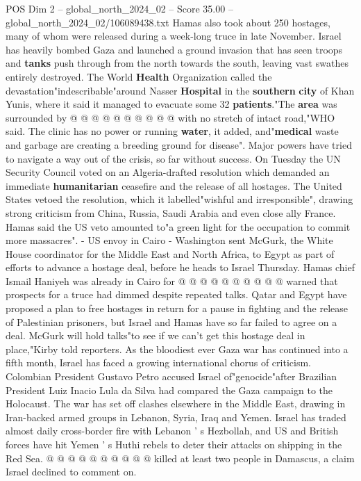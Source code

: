 \begin{textsample}{POS Dim 2 – global\_north\_2024\_02 – Score 35.00 – global\_north\_2024\_02/106089438.txt}
Hamas also took about 250 hostages, many of whom were released during a week-long truce in late November.
Israel has heavily bombed Gaza and launched a ground invasion that has seen troops and \textbf{tanks} push through from the north towards the south, leaving vast swathes entirely destroyed.
The World \textbf{Health} Organization called the devastation"indescribable"around Nasser \textbf{Hospital} in the \textbf{southern} \textbf{city} of Khan Yunis, where it said it managed to evacuate some 32 \textbf{patients}."The \textbf{area} was surrounded by @ @ @ @ @ @ @ @ @ @ with no stretch of intact road,"WHO said.
The clinic has no power or running \textbf{water}, it added, and"\textbf{medical} waste and garbage are creating a breeding ground for disease".
Major powers have tried to navigate a way out of the crisis, so far without success.
On Tuesday the UN Security Council voted on an Algeria-drafted resolution which demanded an immediate \textbf{humanitarian} ceasefire and the release of all hostages.
The United States vetoed the resolution, which it labelled"wishful and irresponsible", drawing strong criticism from China, Russia, Saudi Arabia and even close ally France.
Hamas said the US veto amounted to"a green light for the occupation to commit more massacres". - US envoy in Cairo - Washington sent McGurk, the White House coordinator for the Middle East and North Africa, to Egypt as part of efforts to advance a hostage deal, before he heads to Israel Thursday.
Hamas chief Ismail Haniyeh was already in Cairo for @ @ @ @ @ @ @ @ @ @ warned that prospects for a truce had dimmed despite repeated talks.
Qatar and Egypt have proposed a plan to free hostages in return for a pause in fighting and the release of Palestinian prisoners, but Israel and Hamas have so far failed to agree on a deal.
McGurk will hold talks"to see if we can't get this hostage deal in place,"Kirby told reporters.
As the bloodiest ever Gaza war has continued into a fifth month, Israel has faced a growing international chorus of criticism.
Colombian President Gustavo Petro accused Israel of"genocide"after Brazilian President Luiz Inacio Lula da Silva had compared the Gaza campaign to the Holocaust.
The war has set off clashes elsewhere in the Middle East, drawing in Iran-backed armed groups in Lebanon, Syria, Iraq and Yemen.
Israel has traded almost daily cross-border fire with Lebanon ' s Hezbollah, and US and British forces have hit Yemen ' s Huthi rebels to deter their attacks on shipping in the Red Sea. @ @ @ @ @ @ @ @ @ @ killed at least two people in Damascus, a claim Israel declined to comment on.

\end{textsample}

